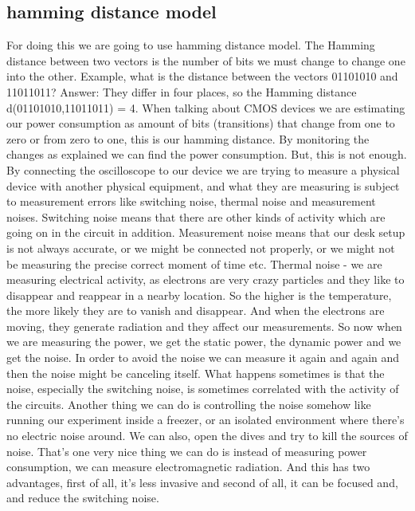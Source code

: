 \subsection { hamming distance model }
For doing this we are going to use hamming distance model. The Hamming distance between two vectors is the number of bits we must change to change one into the other. Example, what is the distance between the vectors 01101010 and 11011011? 
Answer: They differ in four places, so the Hamming distance d(01101010,11011011) = 4.
When talking about CMOS devices we are estimating our power consumption as amount of bits (transitions) that change from one to zero or from zero to one, this is our hamming distance. By monitoring the changes as explained we can find the power consumption.
But, this is not enough. By connecting the oscilloscope to our device we are trying to measure a physical device with another physical equipment, and what they are measuring is subject to measurement errors like switching noise, thermal noise and measurement noises.
Switching noise means that there are other kinds of activity which are going on in the circuit in addition. Measurement noise means that our desk setup is not always accurate, or we might be connected not properly, or we might not be measuring the precise correct moment of time etc. Thermal noise - we are measuring electrical activity, as electrons are very crazy particles and they like to disappear and reappear in a nearby location. So the higher is the temperature, the more likely they are to vanish and disappear. And when the electrons are moving, they generate radiation and they affect our measurements.
So now when we are measuring the power, we get the static power, the dynamic power and we get the noise.
In order to avoid the noise we can measure it again and again and then the noise might be canceling itself. What happens sometimes is that the noise, especially the switching noise, is sometimes correlated with the activity of the circuits. Another thing we can do is controlling the noise somehow like running our experiment inside a freezer, or an isolated environment where there's no electric noise around. We can also, open the dives and try to kill the sources of noise.
That's one very nice thing we can do is instead of measuring power consumption, we can measure electromagnetic radiation. And this has two advantages, first of all, it's less invasive and second of all, it can be focused and, and reduce the switching noise.
